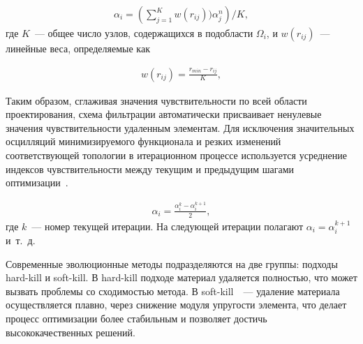 \begin{equation}\label{eq:alpha}
	\begin{aligned}
		\alpha_i = \left(\sum_{j=1}^K w(r_{ij})) \alpha_j^n \right)/K,
	\end{aligned}
\end{equation}
где $K$~--- общее число узлов, содержащихся в подобласти $\Omega_i$, и $w(r_{ij})$~--- линейные веса, определяемые как

\begin{equation}\label{eq:w}
	\begin{aligned}
		w(r_{ij}) = \frac{r_{min}-r_{ij}}{K},
	\end{aligned}
\end{equation}

Таким образом, сглаживая значения чувствительности по всей области проектирования, схема фильтрации автоматически присваивает ненулевые значения чувствительности удаленным элементам. Для исключения значительных осцилляций минимизируемого функционала и резких изменений соответствующей топологии в итерационном процессе используется усреднение индексов чувствительности между текущим и предыдущим шагами оптимизации~\cite{Shevtsov2014}.

\begin{equation}\label{eq:w}
	\begin{aligned}
\alpha_i = \frac{\alpha_i^k - \alpha_i^{k+1}}{2},
	\end{aligned}
\end{equation}
где $k$~--- номер текущей итерации. На следующей итерации полагают $\alpha_i=\alpha_i^{k+1}$ и~т.~д. 


Современные эволюционные методы подразделяются на две группы: подходы hard-kill и soft-kill. В hard-kill подходе материал удаляется полностью, что может вызвать проблемы со сходимостью метода. В soft-kill~\cite{Ghabraie2015}~--- удаление материала осуществляется плавно, через снижение модуля упругости элемента, что делает процесс оптимизации более стабильным и позволяет достичь высококачественных решений.

